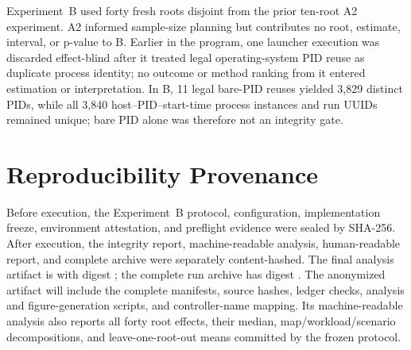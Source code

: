 \documentclass[sigconf,review,anonymous]{acmart}
\begin{document}
Experiment~B used forty fresh roots disjoint from the prior ten-root A2
experiment. A2 informed sample-size planning but contributes no root, estimate,
interval, or p-value to B. Earlier in the program, one launcher execution was
discarded effect-blind after it treated legal operating-system PID reuse as
duplicate process identity; no outcome or method ranking from it entered
estimation or interpretation. In B, 11 legal bare-PID reuses yielded 3{,}829
distinct PIDs, while all 3{,}840 host--PID--start-time process instances and run
UUIDs remained unique; bare PID alone was therefore not an integrity gate.

\section{Reproducibility Provenance}

Before execution, the Experiment~B protocol, configuration, implementation
freeze, environment attestation, and preflight evidence were sealed by
SHA-256. After execution, the integrity report, machine-readable analysis,
human-readable report, and complete archive were separately content-hashed.
The final analysis artifact is
 with digest
\texttt{};
the complete run archive has digest
\texttt{}.
The anonymized artifact will include the complete manifests, source hashes,
ledger checks, analysis and figure-generation scripts, and controller-name
mapping. Its machine-readable analysis also reports all forty root effects,
their median, map/workload/scenario decompositions, and leave-one-root-out
means committed by the frozen protocol.
\end{document}
